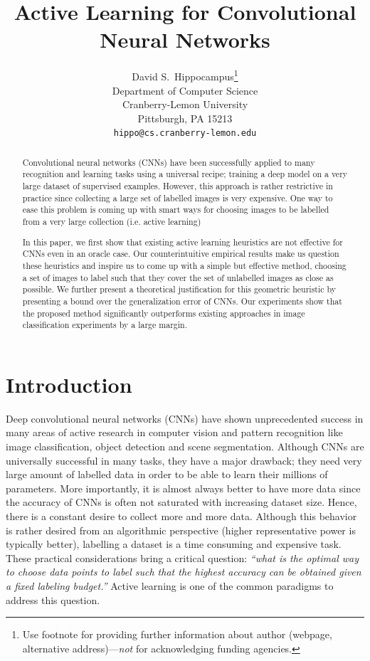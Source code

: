 \documentclass{article}
\title{Active Learning for Convolutional Neural Networks}
\author{
  David S.~Hippocampus\thanks{Use footnote for providing further
    information about author (webpage, alternative
    address)---\emph{not} for acknowledging funding agencies.} \\
  Department of Computer Science\\
  Cranberry-Lemon University\\
  Pittsburgh, PA 15213 \\
  \texttt{hippo@cs.cranberry-lemon.edu} \\
}
\makeatletter
\newcommand*{\ie}{i.e.\@\xspace}
\makeatother
\begin{document}

\maketitle

\begin{abstract}
Convolutional neural networks (CNNs) have been successfully applied to many recognition and learning tasks using a universal recipe; training a deep model on a very large dataset of supervised examples. However, this approach is rather restrictive in practice since collecting a large set of labelled images is very expensive. One way to ease this problem is coming up with smart ways for choosing images to be labelled from a very large collection (\ie active learning)

In this paper, we first show that existing active learning heuristics are not effective for CNNs even in an oracle case. Our counterintuitive empirical results make us question these heuristics and inspire us to come up with a simple but effective method, choosing a set of images to label such that they cover the set of unlabelled images as close as possible. We further present a theoretical justification for this geometric heuristic by presenting a bound over the generalization error of CNNs. Our experiments show that the proposed method significantly outperforms existing approaches in image classification experiments by a large margin.
\end{abstract}

\section{Introduction}
Deep convolutional neural networks (CNNs) have shown unprecedented success in many areas of active research in computer vision and pattern recognition like image classification, object detection and scene segmentation. Although CNNs are universally successful in many tasks, they have a major drawback; they need very large amount of labelled data in order to be able to learn their millions of parameters. More importantly, it is almost always better to have more data since the accuracy of CNNs is often not saturated with increasing dataset size. Hence, there is a constant desire to collect more and more data. Although this behavior is rather desired from an algorithmic perspective (higher representative power is typically better), labelling a dataset is a time consuming and expensive task. These practical considerations bring a critical question: \emph{``what is the optimal way to choose data points to label such that the highest accuracy can be obtained given a fixed labeling budget.''} Active learning is one of the common paradigms to address this question.
\end{document}
